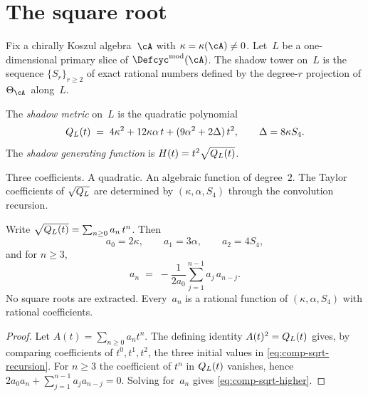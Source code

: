 \section{The square root}
\label{sec:comp-square-root}

Fix a chirally Koszul algebra~$\cA$ with
$\kappa = \kappa(\cA) \neq 0$. Let~$L$ be a one-dimensional
primary slice of $\Defcyc^{\mathrm{mod}}(\cA)$. The shadow
tower on~$L$ is the sequence $\{S_r\}_{r \geq 2}$ of exact
rational numbers defined by the degree-$r$ projection of
$\Theta_\cA$~along~$L$.

\begin{definition}\label{def:comp-shadow-metric}
The \emph{shadow metric} on~$L$ is the quadratic polynomial
\begin{equation}\label{eq:comp-shadow-metric}
 Q_L(t)
 \;=\; 4\kappa^2 + 12\kappa\alpha\, t
 + (9\alpha^2 + 2\Delta)\, t^2,
 \qquad
 \Delta = 8\kappa S_4.
\end{equation}
The \emph{shadow generating function} is
$H(t) = t^2 \sqrt{Q_L(t)}$.
\end{definition}

Three coefficients. A quadratic. An algebraic function of
degree~$2$. The Taylor coefficients of $\sqrt{Q_L}$
are determined by $(\kappa, \alpha, S_4)$ through the convolution
recursion.

\begin{lemma}
\label{lem:comp-sqrt-recursion}
Write $\sqrt{Q_L(t)} = \sum_{n \geq 0} a_n\, t^n$.
Then
\begin{equation}\label{eq:comp-sqrt-recursion}
 a_0 = 2\kappa, \qquad
 a_1 = 3\alpha, \qquad
 a_2 = 4S_4,
\end{equation}
and for $n \geq 3$,
\begin{equation}\label{eq:comp-sqrt-higher}
 a_n \;=\; -\frac{1}{2a_0}
 \sum_{j=1}^{n-1} a_j\, a_{n-j}.
\end{equation}
No square roots are extracted. Every~$a_n$ is a rational
function of $(\kappa, \alpha, S_4)$ with rational coefficients.
\end{lemma}

\begin{proof}
Let $A(t)=\sum_{n\ge0}a_nt^n$.  The defining identity
$A(t)^2=Q_L(t)$ gives, by comparing coefficients of
$t^0,t^1,t^2$, the three initial values in
\eqref{eq:comp-sqrt-recursion}.  For $n\ge3$ the coefficient of
$t^n$ in $Q_L(t)$ vanishes, hence
$2a_0a_n+\sum_{j=1}^{n-1}a_ja_{n-j}=0$.  Solving for~$a_n$ gives
\eqref{eq:comp-sqrt-higher}.
\end{proof}

